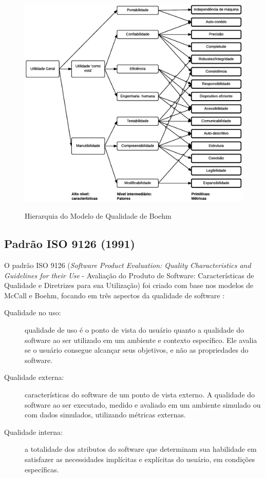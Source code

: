 \documentclass[
	12pt,				%
	openright,			%
	oneside,			%
	a4paper,			%
	english,			%
	brazil,				%
	]{abntex2}
\begin{document}
\begin{figure}[H]
    \centering
    \caption{Hierarquia do Modelo de Qualidade de Boehm}
    \graphicspath{ {./graphics/} }
    \includegraphics[scale=0.95]{boehm-hierarquia_modelo-andrei}
    \label{fig:boehm-hierarquia_modelo}
\end{figure}

\subsection{Padrão ISO 9126 (1991)}
O padrão ISO 9126 (\emph{Software Product Evaluation: Quality Characteristics and Guidelines for their Use} - Avaliação do Produto de Software: Características de Qualidade e Diretrizes para sua Utilização) foi criado com base nos modelos de McCall e Boehm, focando em três aspectos da qualidade de software \cite{SURYN2014}:
\begin{description}
    \item [Qualidade no uso:] qualidade de uso é o ponto de vista do usuário quanto a qualidade do software ao ser utilizado em um ambiente e contexto específico. Ele avalia se o usuário consegue alcançar seus objetivos, e não as propriedades do software.
    \item [Qualidade externa:] características do software de um ponto de vista externo. A qualidade do software ao ser executado, medido e avaliado em um ambiente simulado ou com dados simulados, utilizando métricas externas.
    \item [Qualidade interna:] a totalidade dos atributos do software que determinam sua habilidade em satisfazer as necessidades implícitas e explícitas do usuário, em condições específicas.
\end{description}
\end{document}
